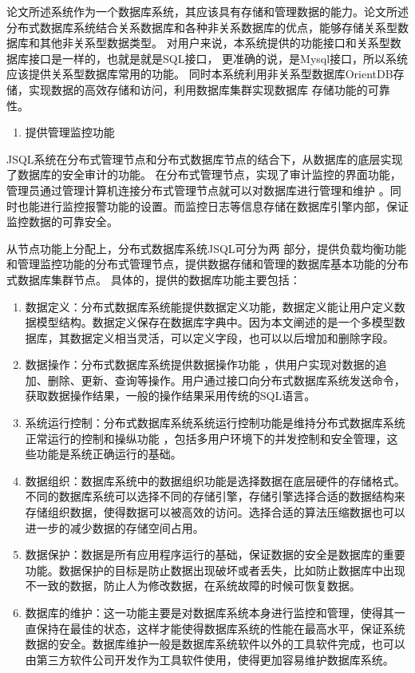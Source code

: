 	论文所述系统作为一个数据库系统，其应该具有存储和管理数据的能力。论文所述分布式数据库系统结合关系数据库和各种非关系数据库的优点，能够存储关系型数据库和其他非关系型数据类型。
	对用户来说，本系统提供的功能接口和关系型数据库接口是一样的，也就是就是SQL接口，
	更准确的说，是Mysql接口，所以系统应该提供关系型数据库常用的功能。
	同时本系统利用非关系型数据库OrientDB存储，实现数据的高效存储和访问，利用数据库集群实现数据库
	存储功能的可靠性。
	
	\begin{enumerate}[resume]
		\item 提供管理监控功能
	\end{enumerate}

	JSQL系统在分布式管理节点和分布式数据库节点的结合下，从数据库的底层实现了数据库的安全审计的功能。
	在分布式管理节点，实现了审计监控的界面功能，管理员通过管理计算机连接分布式管理节点就可以对数据库进行管理和维护
	。同时也能进行监控报警功能的设置。而监控日志等信息存储在数据库引擎内部，保证监控数据的可靠安全。


	从节点功能上分配上，分布式数据库系统JSQL可分为两
	部分，提供负载均衡功能和管理监控功能的分布式管理节点，提供数据存储和管理的数据库基本功能的分布式数据库集群节点。
具体的，提供的数据库功能主要包括：
\begin{enumerate}[fullwidth,itemindent=2em,listparindent=2em]
	\item 数据定义：分布式数据库系统能提供数据定义功能，数据定义能让用户定义数据模型结构。数据定义保存在数据库字典中。因为本文阐述的是一个多模型数据库，其数据定义相当灵活，可以定义字段，也可以以后增加和删除字段。
	\item 数据操作：分布式数据库系统提供数据操作功能
	，供用户实现对数据的追加、删除、更新、查询等操作。用户通过接口向分布式数据库系统发送命令，获取数据操作结果，一般的操作结果采用传统的SQL语言。
	\item 系统运行控制：分布式数据库系统系统运行控制功能是维持分布式数据库系统正常运行的控制和操纵功能
	，包括多用户环境下的并发控制和安全管理，这些功能是系统正确运行的基础。
	\item 数据组织：数据库系统中的数据组织功能是选择数据在底层硬件的存储格式。
	不同的数据库系统可以选择不同的存储引擎，存储引擎选择合适的数据结构来存储组织数据，使得数据可以被高效的访问。选择合适的算法压缩数据也可以进一步的减少数据的存储空间占用。
	\item   数据保护：数据是所有应用程序运行的基础，保证数据的安全是数据库的重要功能。数据保护的目标是防止数据出现破坏或者丢失，比如防止数据库中出现不一致的数据，防止人为修改数据，在系统故障的时候可恢复数据。
	\item  数据库的维护：这一功能主要是对数据库系统本身进行监控和管理，使得其一直保持在最佳的状态，这样才能使得数据库系统的性能在最高水平，保证系统数据的安全。数据库维护一般是数据库系统软件以外的工具软件完成，也可以由第三方软件公司开发作为工具软件使用，使得更加容易维护数据库系统。
\end{enumerate}
